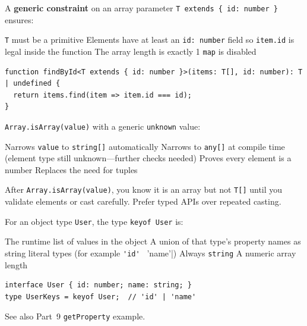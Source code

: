 \question[4]
A \textbf{generic constraint} on an array parameter \lstinline[style=tsinline]|T extends { id: number }| ensures:
\begin{choices}
  \choice \lstinline[style=tsinline]|T| must be a primitive
  \CorrectChoice Elements have at least an \lstinline[style=tsinline]|id: number| field so \lstinline[style=tsinline]|item.id| is legal inside the function
  \choice The array length is exactly 1
  \choice \lstinline[style=tsinline]|map| is disabled
\end{choices}
\begin{solution}
\begin{lstlisting}[style=ts]
function findById<T extends { id: number }>(items: T[], id: number): T | undefined {
  return items.find(item => item.id === id);
}
\end{lstlisting}
\end{solution}

\question[4]
\lstinline[style=tsinline]|Array.isArray(value)| with a generic \lstinline[style=tsinline]|unknown| value:
\begin{choices}
  \choice Narrows \lstinline[style=tsinline]|value| to \lstinline[style=tsinline]|string[]| automatically
  \CorrectChoice Narrows to \lstinline[style=tsinline]|any[]| at compile time (element type still unknown---further checks needed)
  \choice Proves every element is a number
  \choice Replaces the need for tuples
\end{choices}
\begin{solution}
  After \lstinline[style=tsinline]|Array.isArray(value)|, you know it is an array but not \lstinline[style=tsinline]|T[]| until you validate elements or cast carefully. Prefer typed APIs over repeated casting.
\end{solution}

\question[4]
For an object type \lstinline[style=tsinline]|User|, the type \lstinline[style=tsinline]|keyof User| is:
\begin{choices}
  \choice The runtime list of values in the object
  \CorrectChoice A union of that type's property names as string literal types (for example \lstinline[style=tsinline]|'id' | 'name'|)
  \choice Always \lstinline[style=tsinline]|string|
  \choice A numeric array length
\end{choices}
\begin{solution}
\begin{lstlisting}[style=ts]
interface User { id: number; name: string; }
type UserKeys = keyof User;  // 'id' | 'name'
\end{lstlisting}
  See also Part~9 \lstinline[style=tsinline]|getProperty| example.
\end{solution}

